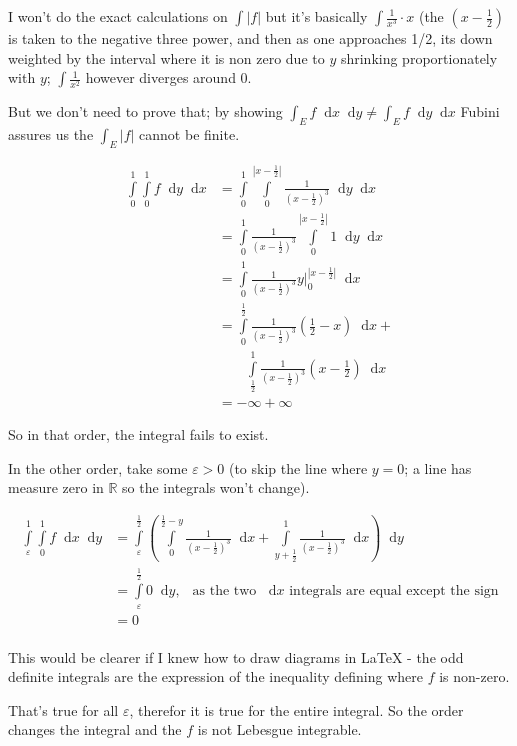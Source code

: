 \documentclass[11pt,oneside]{article}
\numberwithin{equation}{section}
\theoremstyle{definition}
\def\RR{\mathbb{R}}
\newcommand*\diff{\mathop{}\!\mathrm{d}}
\newcommand{\abs}[1]{\left| {#1} \right|}
\begin{document}
\begin{solution}
\begin{enumerate}[(a)]
  I won't do the exact calculations on $\int \left| f \right|$ but it's
  basically $\int \frac{1}{x^3} \cdot x $ (the $(x - \frac{1}{2})$ is
  taken to the negative three power, and then as one approaches 1/2,
  its down weighted by the interval where it is non zero due to $y$
  shrinking proportionately with $y$; $\int \frac{1}{x^2}$ however diverges
  around $0$.

  But we don't need to prove that; by showing $\int _ E f \diff x \diff y \neq \int _ E f \diff y \diff x$
  Fubini assures us the $\int _E \left| f \right| $ cannot be finite.  


  \begin{align*}
  \int \limits _0^1  \int \limits _0 ^ 1 f \diff y \diff x & =   \int \limits _0^1  \int \limits _0 ^ {\abs{x - \frac{1}{2}}} \frac{1}{(x - \frac{1}{2})^3} \diff y \diff x \\
  & =   \int \limits _0^1  \frac{1}{(x - \frac{1}{2})^3} \int \limits _0 ^ {\abs{x - \frac{1}{2}}} 1 \diff y \diff x \\
  & =   \int \limits _0^1  \frac{1}{(x - \frac{1}{2})^3} y \rvert _ 0 ^ {\abs{x - \frac{1}{2}}} \diff x \\
  & =   \int \limits _0^{\frac{1}{2}} \frac{1}{(x - \frac{1}{2})^3} (\frac{1}{2} - x) \diff x  + \\
    & \quad \quad  \int \limits _{\frac{1}{2}}^{1} \frac{1}{(x -\frac{1}{2})^3} (x - \frac{1}{2} ) \diff x  \\
    & = - \infty + \infty 
  \end{align*}

  So in that order, the integral fails to exist.  

  In the other order, take some $\varepsilon > 0$ (to skip the line where $y = 0$; a line has measure zero in $\RR$ so the integrals won't change).  

  \begin{align*}
    \int \limits _\varepsilon ^1  \int \limits _0 ^ 1 f \diff x \diff y & = \int \limits _\varepsilon^{\frac{1}{2}}  \left( \int \limits _0 ^ {\frac{1}{2}-y} \frac{1}{(x - \frac{1}{2})^3} \diff x  + \int \limits _{y + \frac{1}{2}}^1 \frac{1}{(x - \frac{1}{2})^3} \diff x \right) \diff y \\ 
    & = \int \limits _\varepsilon^{\frac{1}{2}} 0  \diff y,  \ \ \textrm{ as the two } \diff x \textrm{ integrals are equal except the sign} \\
    & = 0 \\
  \end{align*}

  This would be clearer if I knew how to draw diagrams in LaTeX - the
  odd definite integrals are the expression of the inequality defining
  where $f$ is non-zero.
  
  That's true for all $\varepsilon$, therefor it is true for the
  entire integral.  So the order changes the integral and the $f$ is
  not Lebesgue integrable.
  
\end{enumerate}
\end{solution}
\end{document}
